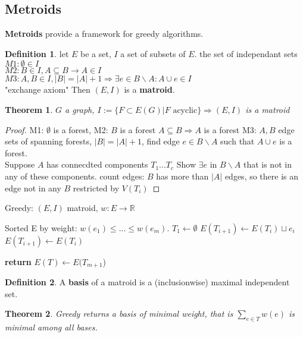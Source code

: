 \documentclass{article}
\newtheorem*{theorem}{Theorem}
\theoremstyle{definition}
\newtheorem*{definition}{Definition}
\theoremstyle{remark}
\begin{document}
\subsection*{Metroids}
\textbf{Metroids} provide a framework for greedy algorithms.
\begin{definition}
    let $E$ be a set, $I$ a set of subsets of $E$. the set of independant sets\\
    $M1: \emptyset \in I$\\
    $M2: B \in I, A \subseteq B \rightarrow A \in I$\\
    $M3: A,B \in I, |B| = |A| + 1 \Rightarrow \exists e \in B \backslash A: A \cup {e} \in I$\\ "exchange axiom"
    Then $(E,I)$ is a \textbf{matroid}.
\end{definition}
\begin{theorem}
    $G$ a graph, $I:=\{F \subset E(G) | F \text{ acyclic} \} \Rightarrow (E,I)$ is a matroid
\end{theorem}
\begin{proof}
    M1: $\emptyset$ is a forest, M2: $B$ is a forest $A \subseteq B \Rightarrow A$ is a forest
    M3: $A,B$ edge sets of spanning forests, $|B|=|A| + 1$, find edge $e \in B \backslash A$ such that $A \cup e$ is a forest.\\
    Suppose $A$ has connecdted components $T_1 ... T_c$
    Show $\exists e$ in $B\backslash A$ that is not in any of these components.
    count edges:
    $B$ has more than $|A|$ edges, so there is an edge not in any $B$ restricted by $V(T_i)$
\end{proof}
\begin{algorithm}
    Greedy: $(E,I)$ matroid, $w: E \rightarrow \mathbb{R}$ 
    \begin{algorithmic}
    \Require Sorted E by weight: $w(e_1) \leq ... \leq w(e_m)$.
    \State $T_1 \gets \emptyset$
            \State $E(T_{i+1}) \gets E(T_i) \sqcup e_i $
        \Else
            \State $E(T_{i+1}) \gets E(T_i) $
        \EndIf
    
       
    \EndFor
    \State \textbf{return} $E(T) \gets E(T_{m+1}$)
    \end{algorithmic}
\end{algorithm}
\begin{definition}
    A \textbf{basis} of a matroid is a (inclusionwise) maximal independent set.
\end{definition}
\begin{theorem}
    Greedy returns a basis of minimal weight, that is $\sum_{e\in T} w(e)$ is minimal among all bases.
\end{theorem}
\end{document}

